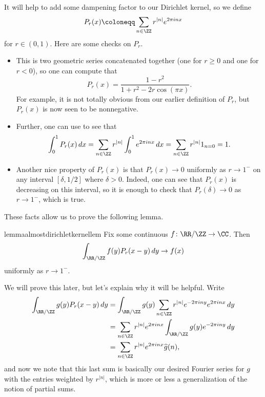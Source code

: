 \documentclass[../notes.tex]{subfiles}
\begin{document}
It will help to add some dampening factor to our Dirichlet kernel, so we define
\[P_r(x)\coloneqq\sum_{n\in\ZZ}r^{\left|n\right|}e^{2\pi inx}\]
for $r\in(0,1)$. Here are some checks on $P_r$.
\begin{itemize}
	\item This is two geometric series concatenated together (one for $r\ge0$ and one for $r<0$), so one can compute that
	\[P_r(x)=\frac{1-r^2}{1+r^2-2r\cos(\pi x)}.\]
	For example, it is not totally obvious from our earlier definition of $P_r$, but $P_r(x)$ is now seen to be nonnegative.
	\item Further, one can use  to see that
	\[\int_0^1P_r(x)\,dx=\sum_{n\in\ZZ}r^{\left|n\right|}\int_0^1e^{2\pi inx}\,dx=\sum_{n\in\ZZ}r^{\left|n\right|}1_{n=0}=1.\]
	\item Another nice property of $P_r(x)$ is that $P_r(x)\to0$ uniformly as $r\to1^-$ on any interval $[\delta,1/2]$ where $\delta>0$. Indeed, one can see that $P_r(x)$ is decreasing on this interval, so it is enough to check that $P_r(\delta)\to0$ as $r\to1^-$, which is true.
\end{itemize}
These facts allow us to prove the following lemma.
\begin{restatable}{lemma}{almostdirichletkernellem} \label{lem:almost-dirichlet-kernel}
	Fix some continuous $f\colon\RR/\ZZ\to\CC$. Then
	\[\int_{\RR/\ZZ}f(y)P_r(x-y)\,dy\to f(x)\]
	uniformly as $r\to1^-$.
\end{restatable}
\noindent We will prove this later, but let's explain why it will be helpful. Write
\begin{align*}
	\int_{\RR/\ZZ}g(y)P_r(x-y)\,dy &= \int_{\RR/\ZZ}g(y)\sum_{n\in\ZZ}r^{\left|n\right|}e^{-2\pi iny}e^{2\pi inx}\,dy \\
	&= \sum_{n\in\ZZ}r^{\left|n\right|}e^{2\pi inx}\int_{\RR/\ZZ}g(y)e^{-2\pi iny}\,dy \\
	&= \sum_{n\in\ZZ}r^{\left|n\right|}e^{2\pi inx}\widehat g(n),
\end{align*}
and now we note that this last sum is basically our desired Fourier series for $g$ with the entries weighted by $r^{\left|n\right|}$, which is more or less a generalization of the notion of partial sums.
\end{document}
